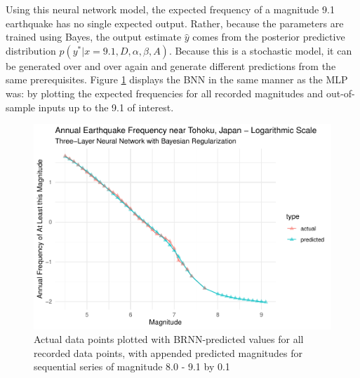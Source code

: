 Using this neural network model, the expected frequency of a magnitude
9.1 earthquake has no single expected output.  Rather, because the parameters are trained using Bayes, the output estimate $\hat{y}$ comes from the posterior predictive distribution $p(y^*|x=9.1,D,\alpha,\beta,A)$.  Because this is a stochastic model, it can be generated over and over again and generate different predictions from the same prerequisites.  Figure \ref{tohoku_brnn} displays the BNN in the same manner as the MLP was: by plotting the expected frequencies for all recorded magnitudes and out-of-sample inputs up to the 9.1 of interest.

\begin{figure}[H]
    \center
    \includegraphics[width=0.8\linewidth]{earthquakes_files/figure-latex/unnamed-chunk-11-1.pdf}
    \caption{\footnotesize{Actual data points plotted with BRNN-predicted values for all recorded data points, with appended predicted magnitudes for sequential series of magnitude 8.0 - 9.1 by 0.1}}
    \label{tohoku_brnn}
\end{figure}

